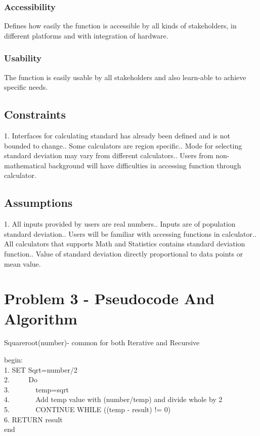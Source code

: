 \documentclass[a4paper,12pt]{article}
\begin{document}
\begin{titlepage}
\subsubsection{Accessibility}
Defines how easily the function is accessible by all kinds of stakeholders, in different platforms and with integration of hardware.
\subsubsection{Usability}
The function is easily usable by all stakeholders and also learn-able to achieve specific needs.

\subsection{Constraints}
1.	Interfaces for calculating standard has already been defined and is not bounded to change..	Some calculators are region specific..  Mode for selecting standard deviation may vary from different calculators..  Users from non-mathematical background will have difficulties in accessing function through calculator.

\subsection{Assumptions}
1.	All inputs provided by users are real numbers..	Inputs are of population standard deviation..	Users will be familiar with accessing functions in calculator..	All calculators that supports Math and Statistics contains standard deviation function..	Value of standard deviation directly proportional to data points or mean value.

\section{Problem 3 - Pseudocode And Algorithm}
\newpage
\begin{algorithm}
\caption{Squareroot(number)- common for both Iterative and Recursive}
begin: \\
1. SET Sqrt=number/2\\
2. $\hspace{2em}$ Do\\
3. $\hspace{3em}$ temp=sqrt\\
4. $\hspace{3em}$ Add temp value with (number/temp) and divide whole by 2\\
5. $\hspace{3em}$ CONTINUE WHILE ((temp - result) != 0)\\
6. RETURN result\\
end
\end{algorithm}

\end{titlepage}
\end{document}
